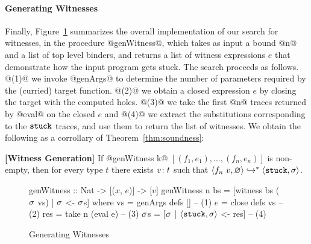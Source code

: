 \paragraph{Generating Witnesses}
%
Finally, Figure~\ref{fig:algo-gen-witness} summarizes the overall
implementation of our search for witnesses, in the procedure @genWitness@,
which takes as input a bound @n@ and a list of top level binders, and
returns a list of witness expressions $e$ that demonstrate how the input
program gets stuck.
%
The search proceeds as follows.
%
@(1)@ we invoke @genArgs@ to determine the number of parameters required
by the (curried) target function.
%
@(2)@ we obtain a closed expression $e$ by closing the target with the
computed holes.
%
@(3)@ we take the first @n@ traces returned by @eval@ on the closed $e$
and
@(4)@ we extract the substitutions corresponding to the $\mathtt{stuck}$ traces,
and use them to return the list of witnesses.
%
We obtain the following as a corrollary of Theorem~\ref{thm:soundness}:

\begin{thm}{\textbf{[Witness Generation]}}
\label{thm:generation}
  If @genWitness k@ $[(f_1, e_1), \ldots, (f_n, e_n)]$ is non-empty,
  then for every type $t$ there exists ${v} \colon {t}$ such that
  $\langle f_n \ v, \varnothing \rangle \hookrightarrow^{*} \langle \mathtt{stuck}, \sigma \rangle$.
\end{thm}

\begin{figure}[t]
\centering
\begin{mcode}
genWitness :: Nat -> [($x$, $e$)] -> [$v$]
genWitness n bs
       = [witness bs ($\sigma$ vs) | $\sigma$ <- $\sigma$s]
  where
   vs  = genArgs defs []      -- (1)
   $e$    = close defs vs        -- (2)
   res = take n (eval e)      -- (3)
   $\sigma$s   = [$\sigma$ | $\langle \mathtt{stuck}, \sigma \rangle$ <- res]  -- (4)
\end{mcode}
\caption{Generating Witnesses}
\label{fig:algo-gen-witness}
\end{figure}


